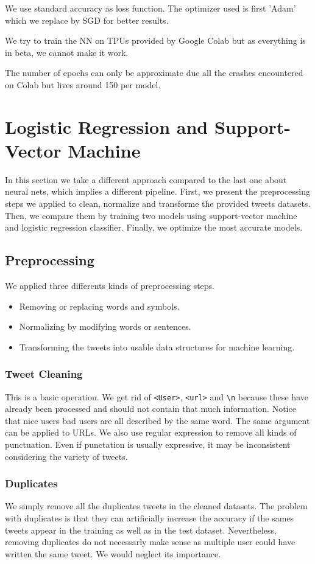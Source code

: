 \documentclass[11pt, a4paper, twocolumn]{article}
\begin{document}
We use standard accuracy as loss function. The optimizer used is first 'Adam' which we replace by SGD for better results.

We try to train the NN on TPUs provided by Google Colab but as everything is in beta, we cannot make it work.

The number of epochs can only be approximate due all the crashes encountered on Colab but lives around 150 per model.
\section{Logistic Regression and Support-Vector Machine}
In this section we take a different approach compared to the last one about neural nets, which implies a different pipeline. First, we present the preprocessing steps we applied to clean, normalize and transforme the provided tweets datasets. Then, we compare them by training two models using support-vector machine and logistic regression classifier. Finally, we optimize the most accurate models.

\subsection{Preprocessing}
We applied three differents kinds of preprocessing steps.
\begin{itemize}
	\item Removing or replacing words and symbols.
	\item Normalizing by modifying words or sentences.
	\item Transforming the tweets into usable data structures for machine learning.
\end{itemize}

\subsubsection{Tweet Cleaning}
This is a basic operation. We get rid of \texttt{<User>}, \texttt{<url>} and \verb"\n" because these have already been processed and should not contain that much information. Notice that nice users bad users are all described by the same word. The same argument can be applied to URLs. We also use regular expression to remove all kinds of punctuation. Even if punctation is usually expressive, it may be inconsistent considering the variety of tweets.
\subsubsection{Duplicates}
We simply remove all the duplicates tweets in the cleaned datasets. The problem with duplicates is that they can artificially increase the accuracy if the sames tweets appear in the training as well as in the test dataset. Nevertheless, removing duplicates do not necessarly make sense as multiple user could have written the same tweet. We would neglect its importance.
\end{document}
